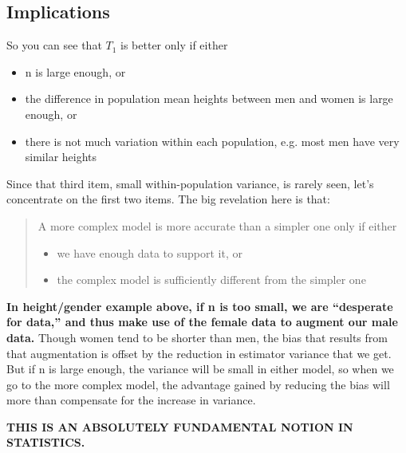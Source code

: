 \subsection{Implications}
\label{biasvvariance}

So you can see that $T_1$ is better only if either

\begin{itemize}

\item n is large enough, or

\item the difference in population mean heights between men and women is
large enough, or

\item there is not much variation within each population, e.g. most men
have very similar heights

\end{itemize}

Since that third item, small within-population variance, is rarely seen,
let's concentrate on the first two items.  The big revelation here is
that:

\begin{quote}
A more complex model is more accurate than a simpler one only if either 

\begin{itemize}

\item we have enough data to support it, or

\item the complex model is sufficiently different from the simpler one

\end{itemize}

\end{quote}

{\bf In height/gender example above, if n is too small, we are ``desperate
for data,'' and thus make use of the female data to augment our male
data.}  Though women tend to be shorter than men, the bias that results
from that augmentation is offset by the reduction in estimator variance
that we get.  But if n is large enough, the variance will be small in
either model, so when we go to the more complex model, the advantage
gained by reducing the bias will more than compensate for the increase
in variance. 

{\bf THIS IS AN ABSOLUTELY FUNDAMENTAL NOTION IN STATISTICS.}


